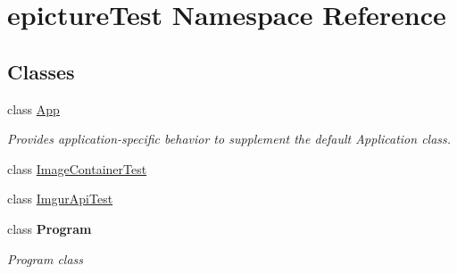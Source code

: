 \hypertarget{namespaceepicture_test}{}\section{epicture\+Test Namespace Reference}
\label{namespaceepicture_test}
\subsection*{Classes}
\begin{DoxyCompactItemize}
\item 
class \mbox{\hyperlink{classepicture_test_1_1_app}{App}}
\begin{DoxyCompactList}\small\item\em Provides application-\/specific behavior to supplement the default Application class. \end{DoxyCompactList}\item 
class \mbox{\hyperlink{classepicture_test_1_1_image_container_test}{Image\+Container\+Test}}
\item 
class \mbox{\hyperlink{classepicture_test_1_1_imgur_api_test}{Imgur\+Api\+Test}}
\item 
class {\bfseries Program}
\begin{DoxyCompactList}\small\item\em Program class \end{DoxyCompactList}\end{DoxyCompactItemize}
